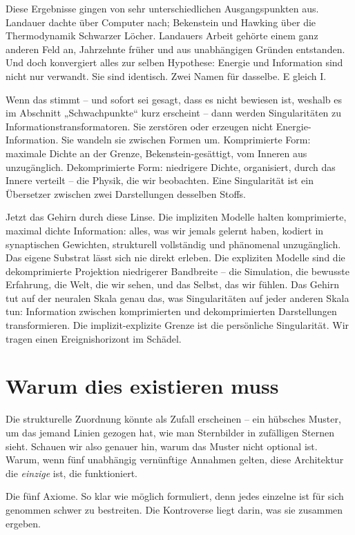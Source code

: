 \documentclass[11pt, twoside, openright]{book}
\begin{document}
Diese Ergebnisse gingen von sehr unterschiedlichen Ausgangspunkten aus. Landauer dachte über Computer nach; Bekenstein und Hawking über die Thermodynamik Schwarzer Löcher. Landauers Arbeit gehörte einem ganz anderen Feld an, Jahrzehnte früher und aus unabhängigen Gründen entstanden. Und doch konvergiert alles zur selben Hypothese: Energie und Information sind nicht nur verwandt. Sie sind identisch. Zwei Namen für dasselbe. E gleich I.

Wenn das stimmt -- und sofort sei gesagt, dass es nicht bewiesen ist, weshalb es im Abschnitt „Schwachpunkte“ kurz erscheint -- dann werden Singularitäten zu Informationstransformatoren. Sie zerstören oder erzeugen nicht Energie-Information. Sie wandeln sie zwischen Formen um. Komprimierte Form: maximale Dichte an der Grenze, Bekenstein-gesättigt, vom Inneren aus unzugänglich. Dekomprimierte Form: niedrigere Dichte, organisiert, durch das Innere verteilt -- die Physik, die wir beobachten. Eine Singularität ist ein Übersetzer zwischen zwei Darstellungen desselben Stoffs.

Jetzt das Gehirn durch diese Linse. Die impliziten Modelle halten komprimierte, maximal dichte Information: alles, was wir jemals gelernt haben, kodiert in synaptischen Gewichten, strukturell vollständig und phänomenal unzugänglich. Das eigene Substrat lässt sich nie direkt erleben. Die expliziten Modelle sind die dekomprimierte Projektion niedrigerer Bandbreite -- die Simulation, die bewusste Erfahrung, die Welt, die wir sehen, und das Selbst, das wir fühlen. Das Gehirn tut auf der neuralen Skala genau das, was Singularitäten auf jeder anderen Skala tun: Information zwischen komprimierten und dekomprimierten Darstellungen transformieren. Die implizit-explizite Grenze ist die persönliche Singularität. Wir tragen einen Ereignishorizont im Schädel.

\section*{Warum dies existieren muss}

Die strukturelle Zuordnung könnte als Zufall erscheinen -- ein hübsches Muster, um das jemand Linien gezogen hat, wie man Sternbilder in zufälligen Sternen sieht. Schauen wir also genauer hin, warum das Muster nicht optional ist. Warum, wenn fünf unabhängig vernünftige Annahmen gelten, diese Architektur die \textit{einzige} ist, die funktioniert.

Die fünf Axiome. So klar wie möglich formuliert, denn jedes einzelne ist für sich genommen schwer zu bestreiten. Die Kontroverse liegt darin, was sie zusammen ergeben.
\end{document}
